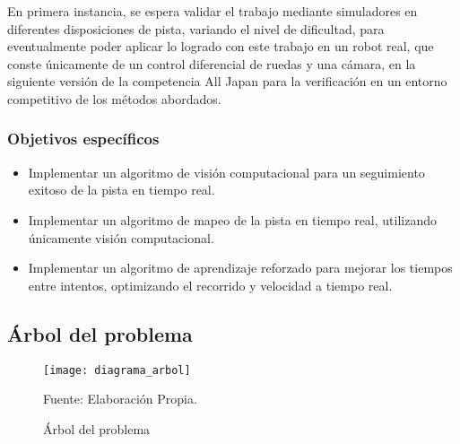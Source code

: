 En primera instancia, se espera validar el trabajo mediante simuladores en diferentes disposiciones de pista, variando el nivel de dificultad, para eventualmente poder aplicar lo logrado con este trabajo en un robot real, que conste únicamente de un control diferencial de ruedas y una cámara, en la siguiente versión de la competencia All Japan para la verificación en un entorno competitivo de los métodos abordados.

\subsubsection{Objetivos específicos}

\begin{itemize}
	\item Implementar un algoritmo de visión computacional para un seguimiento exitoso de la pista en tiempo real.
	\item Implementar un algoritmo de mapeo de la pista en tiempo real, utilizando únicamente visión computacional.
	\item Implementar un algoritmo de aprendizaje reforzado para mejorar los tiempos entre intentos, optimizando el recorrido y velocidad a tiempo real.
\end{itemize}
\newpage
\subsection{Árbol del problema}

\begin{figure}[h]
\centering
\texttt{[image: diagrama\_arbol]}
\caption{\label{fig:arbol} Árbol del problema} Fuente: Elaboración Propia.
\end{figure}
